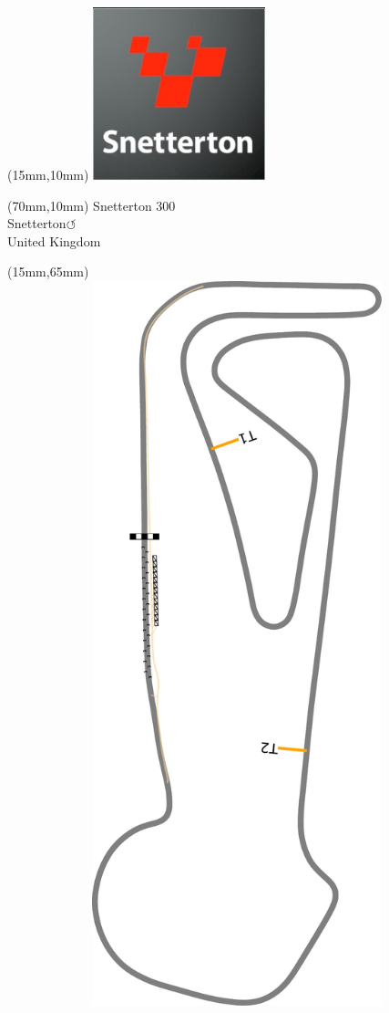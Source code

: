 \null\newpage
\begin{textblock*}{50mm}(15mm,10mm)%
\includegraphics[width=50mm]{LG/2015-05-20_00095.png}
\end{textblock*}
\begin{textblock*}{130mm}(70mm,10mm)%
{\fontsize{20}{20}\selectfont Snetterton 300\\}
{\fontsize{16}{16}\selectfont Snetterton\hfill \huge$\circlearrowleft$\\}
{\fontsize{12}{12}\selectfont United Kingdom\\}
\end{textblock*}
\begin{textblock*}{185mm}(15mm,65mm)%
\centering
\mbox{\includegraphics[width=185mm,height=210mm,keepaspectratio]{PT/SN300.pdf}}
\end{textblock*}
